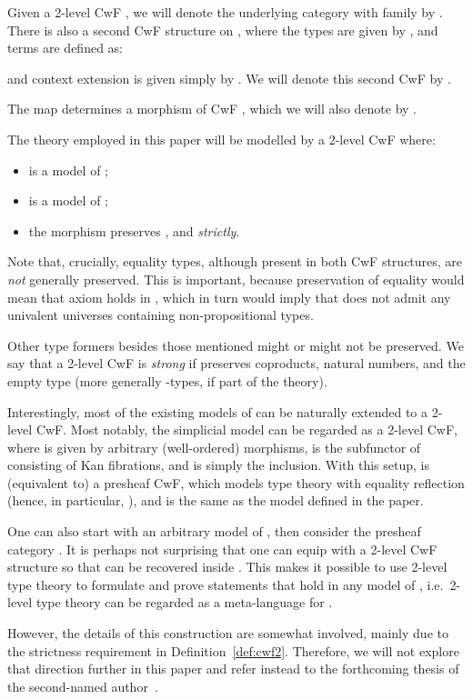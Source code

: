 \documentclass[a4paper,reqno]{amsart}
\theoremstyle{plain}
\theoremstyle{definition}
\begin{document}
Given a 2-level CwF , we will denote the underlying category with family by
.  There is also a second CwF structure on , where the types
are given by , and terms are defined as:

and context extension is given simply by .  We will
denote this second CwF by .

The map  determines a morphism of CwF ,
which we will also denote by .

The theory employed in this paper will be modelled by a 2-level CwF  where:
\begin{itemize}
\item  is a model of ;
\item  is a model of ;
\item the morphism  preserves ,  and  \emph{strictly}.
\end{itemize}

Note that, crucially, equality types, although present in both CwF structures,
are \emph{not} generally preserved.  This is important, because preservation of
equality would mean that axiom  holds in , which in turn would
imply that  does not admit any univalent universes containing
non-propositional types.

Other type formers besides those mentioned might or might not be preserved.  We
say that a 2-level CwF is \emph{strong} if  preserves coproducts, natural numbers, and the empty type (more generally -types, if part of the theory). 

Interestingly, most of the existing models of  can be naturally extended
to a 2-level CwF.  Most notably, the simplicial model
\cite{kapLumsVoe_ssModelOfUF} can be regarded as a 2-level CwF, where  is
given by arbitrary (well-ordered) morphisms,  is the subfunctor of 
consisting of Kan fibrations, and  is simply the inclusion.  With this
setup,  is (equivalent to) a presheaf CwF, which models type theory
with equality reflection (hence, in particular, ), and  is
the same as the model defined in the paper.

One can also start with an arbitrary model  of , then consider the
presheaf category .  It is perhaps not surprising that one can
equip  with a 2-level CwF structure so that  can be recovered
inside .  This makes it possible to use 2-level type
theory to formulate and prove statements that hold in any model of ,
i.e.\ 2-level type theory can be regarded as a meta-language for .

However, the details of this construction are somewhat involved, mainly due to
the strictness requirement in Definition~\ref{def:cwf2}.  Therefore, we will
not explore that direction further in this paper and refer instead to the
forthcoming thesis of the second-named author~\cite{paolo:thesis}.
\end{document}
